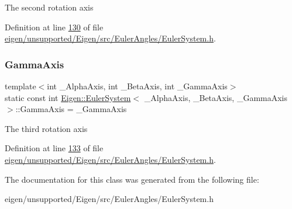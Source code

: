 The second rotation axis 

Definition at line \hyperlink{eigen_2unsupported_2_eigen_2src_2_euler_angles_2_euler_system_8h_source_l00130}{130} of file \hyperlink{eigen_2unsupported_2_eigen_2src_2_euler_angles_2_euler_system_8h_source}{eigen/unsupported/\+Eigen/src/\+Euler\+Angles/\+Euler\+System.\+h}.

\mbox{\label{class_eigen_1_1_euler_system_ad734a405b0a7a9bb6e3faf41a0280adf}} 
\subsubsection{\texorpdfstring{Gamma\+Axis}{GammaAxis}}
{\footnotesize\ttfamily template$<$int \+\_\+\+Alpha\+Axis, int \+\_\+\+Beta\+Axis, int \+\_\+\+Gamma\+Axis$>$ \\
static const int \hyperlink{class_eigen_1_1_euler_system}{Eigen\+::\+Euler\+System}$<$ \+\_\+\+Alpha\+Axis, \+\_\+\+Beta\+Axis, \+\_\+\+Gamma\+Axis $>$\+::Gamma\+Axis = \+\_\+\+Gamma\+Axis\hspace{0.3cm}{\ttfamily [static]}}

The third rotation axis 

Definition at line \hyperlink{eigen_2unsupported_2_eigen_2src_2_euler_angles_2_euler_system_8h_source_l00133}{133} of file \hyperlink{eigen_2unsupported_2_eigen_2src_2_euler_angles_2_euler_system_8h_source}{eigen/unsupported/\+Eigen/src/\+Euler\+Angles/\+Euler\+System.\+h}.



The documentation for this class was generated from the following file\+:\begin{DoxyCompactItemize}
\item 
eigen/unsupported/\+Eigen/src/\+Euler\+Angles/\+Euler\+System.\+h\end{DoxyCompactItemize}
